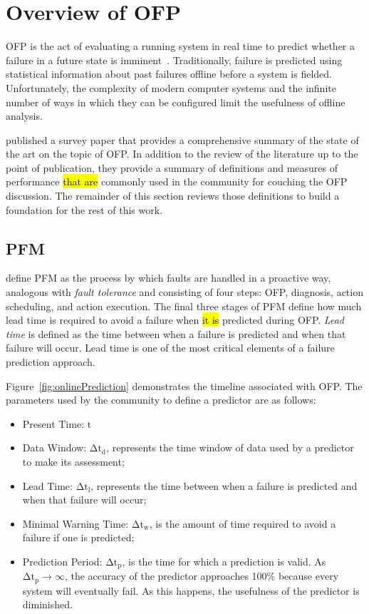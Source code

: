 \section{Overview of \acrfull{OFP}} \label{chapter2}
\ac{OFP} is the act of evaluating a running system in real time to predict
whether a failure in a future state is imminent~\citep{salfnerSurvey}.
Traditionally, failure is predicted using statistical information about past
failures offline before a system is fielded.  Unfortunately, the complexity of
modern computer systems and the infinite number of ways in which they can be
configured limit the usefulness of offline analysis.

\citet{salfnerSurvey} published a survey paper that provides a comprehensive
summary of the state of the art on the topic of \ac{OFP}.  In addition to the
review of the literature up to the point of publication, they provide a summary
of definitions and measures of performance \hl{that are} commonly used in the
community for couching the \ac{OFP} discussion.  The remainder of this section
reviews those definitions to build a foundation for the rest of this work.

\subsection{\acrfull{PFM}} \label{pfm}
\citet{salfnerSurvey} define \ac{PFM} as the process by which faults are
handled in a proactive way, analogous with \emph{fault tolerance} and
consisting of four steps: \ac{OFP}, diagnosis, action scheduling, and action
execution.  The final three stages of \ac{PFM} define how much lead time is
required to avoid a failure when \hl{it is} predicted during \ac{OFP}.
\emph{Lead time} is defined as the time between when a failure is predicted and
when that failure will occur.  Lead time is one of the most critical elements
of a failure prediction approach.


Figure~\ref{fig:onlinePrediction} demonstrates the timeline associated with
\ac{OFP}.  The parameters used by the community to define a predictor are as
follows:
\begin{itemize}
	\item{Present Time: $\mathrm{t}$}
  \item{Data Window: $\mathrm{\Delta t_{d}}$, represents the time window of
  data used by a predictor to make its assessment;}
  \item{Lead Time: $\mathrm{\Delta t_{l}}$, represents the time between when
  a failure is predicted and when that failure will occur;}
  \item{Minimal Warning Time: $\mathrm{\Delta t_{w}}$, is the amount of time
  required to avoid a failure if one is predicted;}
  \item{Prediction Period: $\mathrm{\Delta t_{p}}$, is the time for which a
  prediction is valid.  As $\mathrm{\Delta t_{p} \rightarrow \infty}$, the
  accuracy of the predictor approaches 100\% because every system will
  eventually fail.  As this happens, the usefulness of the predictor is
  diminished.}
\end{itemize}

